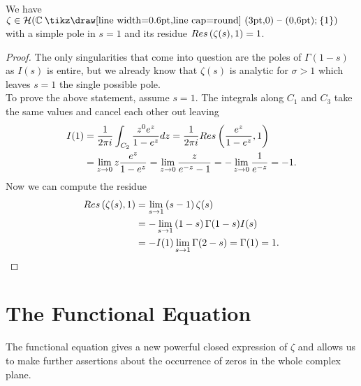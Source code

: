 \begin{theorem}
	We have $\zeta \in \mathcal{H}(\field{C} \mysetminus \fbr{1})$ with a simple pole in $s = 1$ and its residue $Res\left(\zeta(s), 1\right) = 1$.
\end{theorem}
\begin{proof}
	The only singularities that come into question are the poles of $\Gamma(1 - s)$ as $I(s)$ is entire, but we already know that $\zeta(s)$ is analytic for $\sigma > 1$ which leaves $s = 1$ the single possible pole. \\
	To prove the above statement, assume $s = 1$. The integrals along $C_1$ and $C_3$ take the same values and cancel each other out leaving
\begin{equation*}
\begin{aligned}
	I(1) 
	&= \frac{1}{2 \pi i} \int _{C_2} \frac{z^{0} e^z}{1 - e^z} dz = \frac{1}{2 \pi i} Res\left(\frac{e^z}{1 - e^z}, 1\right) \\
	&= \lim\limits _{z \to 0} z \frac{e^z}{1 - e^z} = \lim\limits _{z \to 0} \frac{z}{e^{-z} - 1} = -\lim\limits _{z \to 0} \frac{1}{e^{-z}} = -1.
\end{aligned}
\end{equation*}
	Now we can compute the residue
\begin{equation*}
\begin{aligned}	
	Res\left(\zeta(s), 1\right) 
	&= \lim\limits _{s \to 1} \left(s - 1\right) \zeta(s) \\
	&= -\lim\limits _{s \to 1} \left(1 - s\right) \Gamma(1 - s) I(s) \\
	&= -I(1) \lim\limits _{s \to 1} \Gamma(2 - s) = \Gamma(1) = 1.
\end{aligned}
\end{equation*}
\end{proof}


\section{The Functional Equation}
The functional equation gives a new powerful closed expression of $\zeta$ and allows us to make further assertions about the occurrence of zeros in the whole complex plane.


